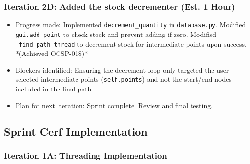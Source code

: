 \subsubsection{Iteration 2D: Added the stock decrementer (Est. 1 Hour)}
\begin{itemize}
	\item Progress made: Implemented \verb|decrement_quantity| in \verb|database.py|. Modified \verb|gui.add_point| to check stock and prevent adding if zero. Modified \verb|_find_path_thread| to decrement stock for intermediate points upon success. *(Achieved OCSP-018)*
	\item Blockers identified: Ensuring the decrement loop only targeted the user-selected intermediate points (\verb|self.points|) and not the start/end nodes included in the final path.
	\item Plan for next iteration: Sprint complete. Review and final testing.
\end{itemize}

\clearpage
\subsection{Sprint Cerf Implementation}

\subsubsection{Iteration 1A: Threading Implementation}

